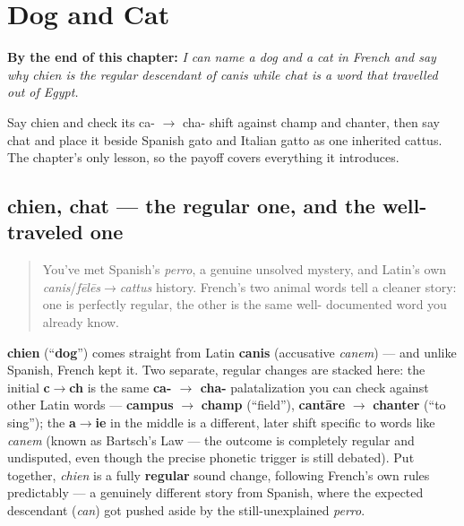 
\chapter{Dog and Cat}
\label{ch:fr-dog-and-cat}

\begin{chapteropening}
\textbf{By the end of this chapter:} \emph{I can name a dog and a cat in French and say why chien is the regular descendant of canis while chat is a word that travelled out of Egypt.}

Say chien and check its ca- $\to$ cha- shift against champ and chanter, then say chat and place it beside Spanish gato and Italian gatto as one inherited cattus. The chapter's only lesson, so the payoff covers everything it introduces.
\end{chapteropening}

\section[chien, chat]{chien, chat — the regular one, and the well-traveled one}

\label{lesson:FR-C22-chien-chat}



\begin{quote}
You've met Spanish's \emph{perro}, a genuine unsolved mystery, and Latin's own \emph{canis}/\emph{fēlēs}$\to$\emph{cattus} history. French's two animal words tell a cleaner story: one is perfectly regular, the other is the same well- documented word you already know.
\end{quote}

\begin{cousinweb}
\textbf{chien} (\textquotedblleft{}\textbf{dog}\textquotedblright{}) comes straight from Latin \textbf{canis} (accusative \emph{canem}) — and unlike Spanish, French kept it. Two separate, regular changes are stacked here: the initial \textbf{c}$\to$\textbf{ch} is the same \textbf{ca- $\to$ cha-} palatalization you can check against other Latin words — \textbf{campus} $\to$ \textbf{champ} (\textquotedblleft{}field\textquotedblright{}), \textbf{cantāre} $\to$ \textbf{chanter} (\textquotedblleft{}to sing\textquotedblright{}); the \textbf{a}$\to$\textbf{ie} in the middle is a different, later shift specific to words like \emph{canem} (known as Bartsch's Law — the outcome is completely regular and undisputed, even though the precise phonetic trigger is still debated). Put together, \emph{chien} is a fully \textbf{regular} sound change, following French's own rules predictably — a genuinely different story from Spanish, where the expected descendant (\emph{can}) got pushed aside by the still-unexplained \emph{perro}.
\end{cousinweb}

